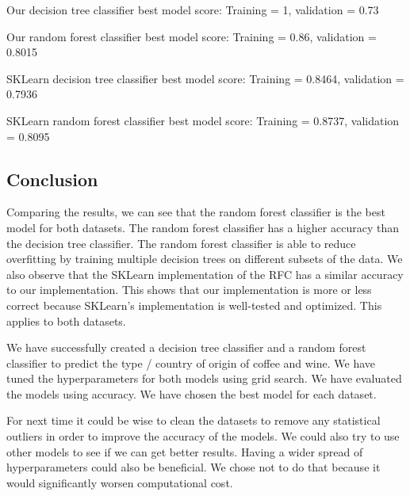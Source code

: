 \documentclass[11pt]{article}
\begin{document}
Our decision tree classifier best model score: Training = 1, validation
= 0.73

Our random forest classifier best model score: Training = 0.86,
validation = 0.8015

SKLearn decision tree classifier best model score: Training = 0.8464,
validation = 0.7936

SKLearn random forest classifier best model score: Training = 0.8737,
validation = 0.8095

    \subsection{Conclusion}\label{conclusion}

Comparing the results, we can see that the random forest classifier is
the best model for both datasets. The random forest classifier has a
higher accuracy than the decision tree classifier. The random forest
classifier is able to reduce overfitting by training multiple decision
trees on different subsets of the data. We also observe that the SKLearn
implementation of the RFC has a similar accuracy to our implementation.
This shows that our implementation is more or less correct because
SKLearn's implementation is well-tested and optimized. This applies to
both datasets.

We have successfully created a decision tree classifier and a random
forest classifier to predict the type / country of origin of coffee and
wine. We have tuned the hyperparameters for both models using grid
search. We have evaluated the models using accuracy. We have chosen the
best model for each dataset.

For next time it could be wise to clean the datasets to remove any
statistical outliers in order to improve the accuracy of the models. We
could also try to use other models to see if we can get better results.
Having a wider spread of hyperparameters could also be beneficial. We
chose not to do that because it would significantly worsen computational
cost.

    


    
    
    
\end{document}
